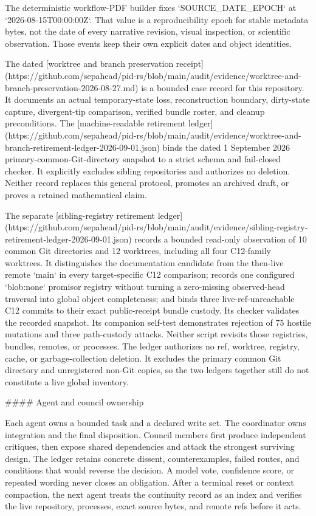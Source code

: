 \documentclass[11pt]{article}
\begin{document}
\begin{markdown}
The deterministic workflow-PDF builder fixes `SOURCE_DATE_EPOCH` at
`2026-08-15T00:00:00Z`. That value is a reproducibility epoch for stable metadata bytes, not the
date of every narrative revision, visual inspection, or scientific observation. Those events keep
their own explicit dates and object identities.

The dated
[worktree and branch preservation receipt](https://github.com/sepahead/pid-rs/blob/main/audit/evidence/worktree-and-branch-preservation-2026-08-27.md)
is a bounded case record for this repository. It documents an actual temporary-state loss,
reconstruction boundary, dirty-state capture, divergent-tip comparison, verified bundle roster,
and cleanup preconditions. The
[machine-readable retirement ledger](https://github.com/sepahead/pid-rs/blob/main/audit/evidence/worktree-and-branch-retirement-ledger-2026-09-01.json)
binds the dated 1 September 2026 primary-common-Git-directory snapshot to a strict schema and
fail-closed checker.
It explicitly excludes sibling repositories and authorizes no deletion. Neither record replaces
this general protocol, promotes an archived draft, or proves a retained mathematical claim.

The separate
[sibling-registry retirement ledger](https://github.com/sepahead/pid-rs/blob/main/audit/evidence/sibling-registry-retirement-ledger-2026-09-01.json)
records a bounded read-only observation of 10 common Git directories and 12 worktrees, including
all four C12-family worktrees. It distinguishes the documentation candidate from the then-live
remote `main` in every target-specific C12 comparison; records one configured `blob:none` promisor
registry without turning a zero-missing observed-head traversal into global object completeness;
and binds three live-ref-unreachable C12 commits to their exact public-receipt bundle custody. Its
checker validates the recorded snapshot. Its companion self-test demonstrates rejection of 75
hostile mutations and three path-custody attacks. Neither script revisits those registries,
bundles, remotes, or processes. The ledger authorizes no ref, worktree, registry, cache, or
garbage-collection deletion. It excludes the primary common Git directory and unregistered non-Git
copies, so the two ledgers together still do not constitute a live global inventory.

#### Agent and council ownership

Each agent owns a bounded task and a declared write set. The coordinator owns integration and the
final disposition. Council members first produce independent critiques, then expose shared
dependencies and attack the strongest surviving design. The ledger retains concrete dissent,
counterexamples, failed routes, and conditions that would reverse the decision. A model vote,
confidence score, or repeated wording never closes an obligation. After a terminal reset or
context compaction, the next agent treats the continuity record as an index and verifies the live
repository, processes, exact source bytes, and remote refs before it acts.


\end{markdown}
\end{document}
